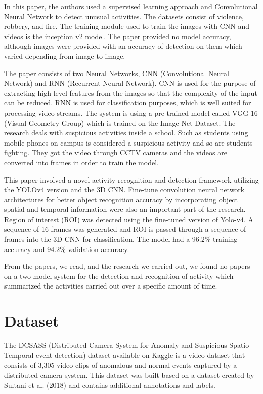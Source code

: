 \documentclass[conference]{IEEEtran}
\begin{document}
In this paper, the authors used a supervised learning approach and Convolutional Neural Network to detect unusual activities. The datasets consist of violence, robbery, and fire. The training module used to train the images with CNN and videos is the inception v2 model. The paper provided no model accuracy, although images were provided with an accuracy of detection on them which varied depending from image to image. \cite{b10}

The paper consists of two Neural Networks, CNN (Convolutional Neural Network) and RNN (Recurrent Neural Network). \cite{b11} CNN is used for the purpose of extracting high-level features from the images so that the complexity of the input can be reduced. RNN is used for classification purposes, which is well suited for processing video streams. The system is using a pre-trained model called VGG-16 (Visual Geometry Group) which is trained on the Image Net Dataset. The research deals with suspicious activities inside a school. Such as students using mobile phones on campus is considered a suspicious activity and so are students fighting. They got the video through CCTV cameras and the videos are converted into frames in order to train the model. 

This paper involved a novel activity recognition and detection framework utilizing the YOLOv4 version and the 3D CNN. Fine-tune convolution neural network architectures for better object recognition accuracy by incorporating object spatial and temporal information were also an important part of the research. \cite{b12} Region of interest (ROI) was detected using the fine-tuned version of Yolo-v4. A sequence of 16 frames was generated and ROI is passed through a sequence of frames into the 3D CNN for classification. The model had a 96.2\% training accuracy and 94.2\% validation accuracy. 

From the papers, we read, and the research we carried out, we found no papers on a two-model system for the detection and recognition of activity which summarized the activities carried out over a specific amount of time.

\section{Dataset}

The DCSASS (Distributed Camera System for Anomaly and Suspicious Spatio-Temporal event detection) dataset available on Kaggle is a video dataset that consists of 3,305 video clips of anomalous and normal events captured by a distributed camera system. This dataset was built based on a dataset created by Sultani et al. (2018) and contains additional annotations and labels.
\end{document}
